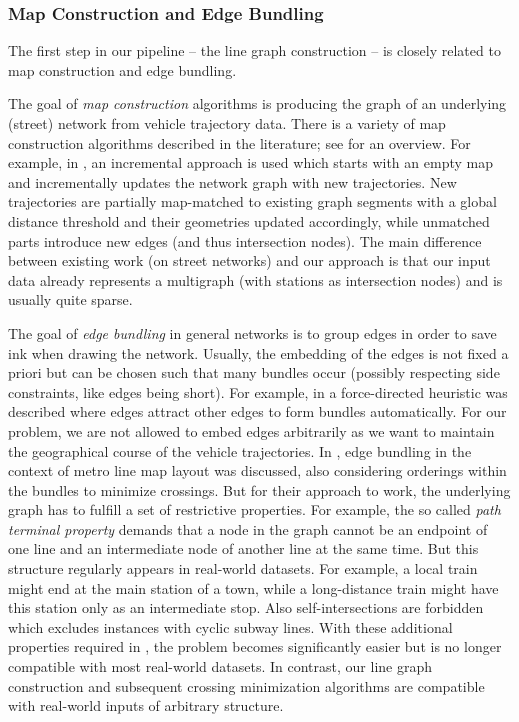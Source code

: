 \documentclass[format=acmsmall, review=false, screen=true]{acmart}
\begin{document}
\subsubsection{Map Construction and Edge Bundling}

The first step in our pipeline -- the line graph construction -- is closely related to map construction and edge bundling. 

The goal of  \emph{map construction} algorithms is producing the graph of an underlying (street) network from vehicle trajectory data. There is a variety of map construction algorithms described in the literature; see \cite{ahm15} for an overview. For example, in \cite{ahm12}, an incremental approach is used which starts with an empty map and incrementally updates the network graph with new trajectories. New trajectories are partially map-matched to existing graph segments with a global distance threshold and their geometries updated accordingly, while unmatched parts introduce new edges (and thus intersection nodes). The main difference between existing work (on street networks) and our approach is that our input data already represents a multigraph (with stations as intersection nodes) and is usually quite sparse. 

The goal of \emph{edge bundling} in general networks is to group edges in order to save ink when drawing the network. Usually, the embedding of the edges is not fixed a priori but can be chosen such that many bundles occur (possibly respecting side constraints, like edges being short). For example, in \cite{hol09} a force-directed heuristic was described where edges attract other edges to form bundles automatically. For our problem, we are not allowed to embed edges arbitrarily as we want to maintain the geographical course of the vehicle trajectories. In \cite{pup11}, edge bundling in the context of metro line map layout was discussed, also considering orderings within the bundles to minimize crossings. But for their approach to work, the underlying graph has to fulfill a set of restrictive properties. For example, the so called \emph{path terminal property} demands that a node in the graph cannot be an endpoint of one line and an intermediate node of another line at the same time. But this structure regularly appears in real-world datasets. For example, a local train might end at the main station of a town, while a long-distance train might have this station only as an intermediate stop. Also self-intersections are forbidden which excludes instances with cyclic subway lines. With these additional properties required in \cite{pup11}, the problem becomes significantly easier but is no longer compatible with most real-world datasets. In contrast, our line graph construction and subsequent crossing minimization algorithms are compatible with real-world inputs of arbitrary structure.
\end{document}
